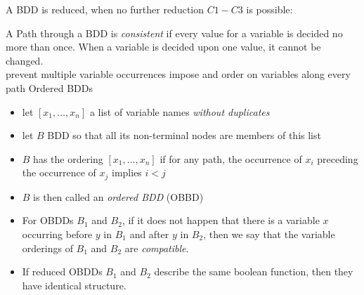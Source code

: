 \documentclass[a4paper, 10pt]{article}
\begin{document}
\begin{mdframed}
\begin{multicols}{2}
\begin{description}
\begin{center}
    \scalebox{1}{}
    \end{center}
\end{description}
\end{multicols}
A BDD is reduced, when no further reduction $C1-C3$ is possible:
\begin{center}
\scalebox{1}{}
\end{center}
\begin{multicols}{3}
\begin{center}
\scalebox{1}{}
\end{center}
\begin{center}
\scalebox{1}{}
\end{center}
\begin{center}
\scalebox{1}{}
\end{center}
\end{multicols}
A Path through a BDD is \emph{consistent} if every value for a variable is decided no more than once. {\tiny When a variable is decided upon one value, it cannot be changed.}
\\ \follows prevent multiple variable occurrences \follows impose and order on variables along every path \follows Ordered BDDs
\begin{itemize}
    \item let $[x_1,\dots,x_n]$ a list of variable names \emph{without duplicates}
    \item let $B$ BDD so that all its non-terminal nodes are members of this list
    \item $B$ has the ordering $[x_1,\dots,x_n]$ if for any path, the occurrence of $x_i$ preceding the occurrence of $x_j$ implies $i<j$
    \item $B$ is then called an \emph{ordered BDD} (OBBD)
\end{itemize}
\begin{itemize}
    \item For OBDDs $B_1$ and $B_2$, if it does not happen that there is a variable $x$ occurring before $y$ in $B_1$ and after $y$ in $B_2$, then we say that the variable orderings of $B_1$ and $B_2$ are \emph{compatible}. \\
    \item If reduced OBDDs $B_1$ and $B_2$ describe the same boolean function, then they have identical structure.

\end{itemize}
\end{mdframed}
\end{document}
